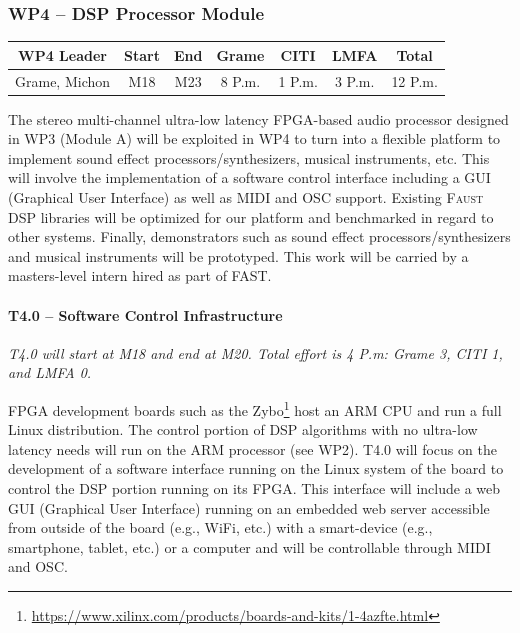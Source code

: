 \documentclass[a4paper,9pt]{extarticle}
\newcommand{\F}{\textsc{Faust}}
\newcommand{\PP}{FAST}
\begin{document}
\subsubsection{WP4 -- DSP Processor Module}
\label{subsubsec:wp4}

\begin{center}
\begin{tabular}{c | c c | c c c | c}
\textbf{WP4 Leader} & \textbf{Start} & \textbf{End} & \textbf{Grame} & \textbf{CITI} & \textbf{LMFA} & \textbf{Total}\\
\hline
Grame, Michon & M18 & M23 & 8 P.m. & 1 P.m. & 3 P.m. & 12 P.m.
\end{tabular}
\end{center}

The stereo multi-channel ultra-low latency FPGA-based audio processor designed in WP3 (Module A) will be exploited in WP4 to turn into a flexible platform to implement sound effect processors/synthesizers, musical instruments, etc. This will involve the implementation of a software control interface including a GUI (Graphical User Interface) as well as MIDI and OSC support. Existing \F{} DSP libraries will be optimized for our platform and benchmarked in regard to other systems. Finally, demonstrators such as sound effect processors/synthesizers and musical instruments will be prototyped. This work will be carried by a masters-level intern hired as part of \PP{}.

\paragraph{T4.0 -- Software Control Infrastructure}

\textit{T4.0 will start at M18 and end at M20. Total effort is 4 P.m: Grame 3, CITI 1, and LMFA 0.}

FPGA development boards such as the Zybo\footnote{\url{https://www.xilinx.com/products/boards-and-kits/1-4azfte.html}} host an ARM CPU and run a full Linux distribution. The control portion of DSP algorithms with no ultra-low latency needs will run on the ARM processor (see WP2). T4.0 will focus on the development of a software interface running on the Linux system of the board to control the DSP portion running on its FPGA. This interface will include a web GUI (Graphical User Interface) running on an embedded web server accessible from outside of the board (e.g., WiFi, etc.) with a smart-device (e.g., smartphone, tablet, etc.) or a computer and will be controllable through MIDI and OSC. 
\end{document}
